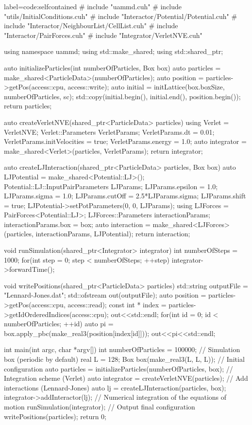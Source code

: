 \documentclass[ twoside,openright,titlepage,numbers=noenddot,%
headinclude,footinclude,cleardoublepage=empty,abstract=on,
BCOR=5mm,paper=b5,fontsize=11pt, dvipsnames
]{scrreprt}
\begin{document}
\begin{code2}{label=code:selfcontained}
# include "uammd.cuh"
# include "utils/InitialConditions.cuh"
# include "Interactor/Potential/Potential.cuh"
# include "Interactor/NeighbourList/CellList.cuh"
# include "Interactor/PairForces.cuh"
# include "Integrator/VerletNVE.cuh"

using namespace uammd;
using std::make_shared;
using std::shared_ptr;

auto initializeParticles(int numberOfParticles, Box box){
  auto particles = make_shared<ParticleData>(numberOfParticles);
  auto position = particles->getPos(access::cpu, access::write);
  auto initial =  initLattice(box.boxSize, numberOfParticles, sc);
  std::copy(initial.begin(), initial.end(), position.begin());
  return particles;
}

auto createVerletNVE(shared_ptr<ParticleData> particles){
  using Verlet = VerletNVE;
  Verlet::Parameters VerletParams;
  VerletParams.dt = 0.01;
  VerletParams.initVelocities = true;
  VerletParams.energy = 1.0;
  auto integrator = make_shared<Verlet>(particles, VerletParams);
  return integrator;
}

auto  createLJInteraction(shared_ptr<ParticleData> particles,
			  Box box){
  auto LJPotential = make_shared<Potential::LJ>();
  Potential::LJ::InputPairParameters LJParams;
  LJParams.epsilon = 1.0;
  LJParams.sigma = 1.0;
  LJParams.cutOff = 2.5*LJParams.sigma;
  LJParams.shift = true;
  LJPotential->setPotParameters(0, 0, LJParams);
  using LJForces = PairForces<Potential::LJ>;
  LJForces::Parameters interactionParams;
  interactionParams.box = box;
  auto interaction = make_shared<LJForces>(particles, interactionParams, LJPotential);
  return interaction;
}

void runSimulation(shared_ptr<Integrator> integrator){
  int numberOfSteps = 1000;
  for(int step = 0; step < numberOfSteps; ++step) {
    integrator->forwardTime();
  }
}

void writePositions(shared_ptr<ParticleData> particles){
  std::string outputFile = "Lennard-Jones.dat";
  std::ofstream out(outputFile);
  auto position = particles->getPos(access::cpu, access::read);
  const int * index = particles->getIdOrderedIndices(access::cpu);
  out<<std::endl;
  for(int id = 0; id < numberOfParticles; ++id){    
    auto pi = box.apply_pbc(make_real3(position[index[id]]));
    out<<pi<<std::endl;
  }
}

int main(int argc, char *argv[]){
  int numberOfParticles = 100000;
  // Simulation box (periodic by default)
  real L = 128;
  Box box(make_real3(L, L, L));
  // Initial configuration
  auto particles = initializeParticles(numberOfParticles, box);
  // Integration scheme (Verlet)
  auto integrator = createVerletNVE(particles);
  // Add interactions (Lennard-Jones)
  auto lj = createLJInteraction(particles, box);
  integrator->addInteractor(lj);
  // Numerical integration of the equations of motion
  runSimulation(integrator);
  // Output final configuration
  writePositions(particles);
  return 0;
}
\end{code2}
\end{document}
